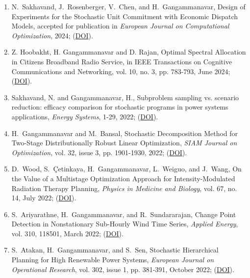 \documentclass[hyperref, margin]{myResume}
\begin{document}
\begin{resume}
\begin{enumerate}[label=J\arabic*., leftmargin=*]
	\item N.\ Sakhavand\footnotemark[3], J.\ Rosenberger, V.\ Chen, and H.\ Gangammanavar, Design of Experiments for the Stochastic Unit Commitment with Economic Dispatch Models, accepted for publication in \textit{European Journal on Computational Optimization}, 2024; (\href{https://doi.org/10.1016/j.ejco.2024.100089}{DOI}). 

	\item Z. Hoobakht\footnotemark[3], H. Gangammanavar and D. Rajan, Optimal Spectral Allocation in Citizens Broadband Radio Service, in IEEE Transactions on Cognitive Communications and Networking, vol. 10, no. 3, pp. 783-793, June 2024; (\href{https://doi.org/10.1109/TCCN.2024.3384491}{DOI}).
	
	\item Sakhavand, N. and Gangammanavar, H., Subproblem sampling vs. scenario reduction: efficacy comparison for stochastic programs in power systems applications, \textit{Energy Systems}, 1-29, 2022; (\href{https://doi.org/10.1007/s12667-022-00558-9}{DOI}).

	\item H.\ Gangammanavar and M.\ Bansal, Stochastic Decomposition Method for Two-Stage Distributionally Robust Linear Optimization, \textit{SIAM Journal on Optimization}, vol. 32, issue 3, pp. 1901-1930, 2022; (\href{https://doi.org/10.1137/20M1378600}{DOI}).
	
	\item D.\ Wood\footnotemark[3], S.\ \c{C}etinkaya, H.\ Gangammanavar, L.\ Weiguo, and J.\ Wang, On the Value of a Multistage Optimization Approach for Intensity-Modulated Radiation Therapy Planning, \textit{Physics in Medicine and Biology}, vol. 67, no. 14, July 2022; (\href{https://doi.org/10.1088/1361-6560/ac7a8a}{DOI}).

	\item S.\ Ariyarathne\footnotemark[1], H.\ Gangammanavar, and R.\ Sundararajan, Change Point Detection in Nonstationary Sub-Hourly Wind Time Series, \textit{Applied Energy}, vol. 310, 118501, March 2022; (\href{https://doi.org/10.1016/j.apenergy.2021.118501}{DOI}).
	
	\item S.\ Atakan, H.\ Gangammanavar, and S.\ Sen, Stochastic Hierarchical Planning for High Renewable Power Systems, \textit{European Journal on Operational Research}, vol. 302, issue 1, pp. 381-391, October 2022; (\href{https://doi.org/10.1016/j.ejor.2021.12.042}{DOI}).
	

\end{enumerate}
\end{resume}
\end{document}
